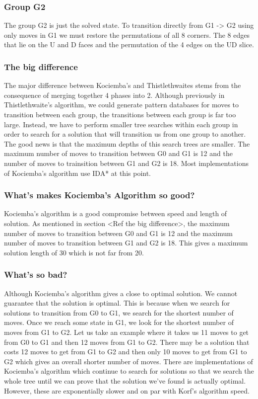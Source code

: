 \documentclass[titlepage]{report}[12pt]
\begin{document}
\subsubsection{Group G2} The group G2 is just the solved state. To transition directly from G1 -> G2 using only moves in G1 we must restore the permutations of all 8 corners. The 8 edges that lie on the U and D faces and the permutation of the 4 edges on the UD slice.

\subsubsection{The big difference}
The major difference between Kociemba's and Thistlethwaites stems from the consequence of merging together 4 phases into 2. Although previously in Thistlethwaite's algorithm, we could generate pattern databases for moves to transition between each group, the transitions between each group is far too large. Instead, we have to perform smaller tree searches within each group in order to search for a solution that will transition us from one group to another. The good news is that the maximum depths of this search trees are smaller. The maximum number of moves to transition between G0 and G1 is 12 and the number of moves to trainsition between G1 and G2 is 18. Most implementations of Kociemba's algorithm use IDA* at this point.

\subsubsection{What's makes Kociemba's Algorithm so good?}
Kociemba's algorithm is a good compromise between speed and length of solution. As mentioned in section <Ref the big difference>, the maximum number of moves to transition between G0 and G1 is 12 and the maximum number of moves to transition between G1 and G2 is 18. This gives a maximum solution length of 30 which is not far from 20. 

\subsubsection{What's so bad?}
Although Kociemba's algorithm gives a close to optimal solution. We cannot guarantee that the solution is optimal. This is because when we search for solutions to transition from G0 to G1, we search for the shortest number of moves. Once we reach some state in G1, we look for the shortest number of moves from G1 to G2. Let us take an example where it takes us 11 moves to get from G0 to G1 and then 12 moves from G1 to G2. There may be a solution that costs 12 moves to get from G1 to G2 and then only 10 moves to get from G1 to G2 which gives an overall shorter number of moves. There are implementations of Kociemba's algorithm which continue to search for solutions so that we search the whole tree until we can prove that the solution we've found is actually optimal. However, these are exponentially slower and on par with Korf's algorithm speed.
\end{document}
